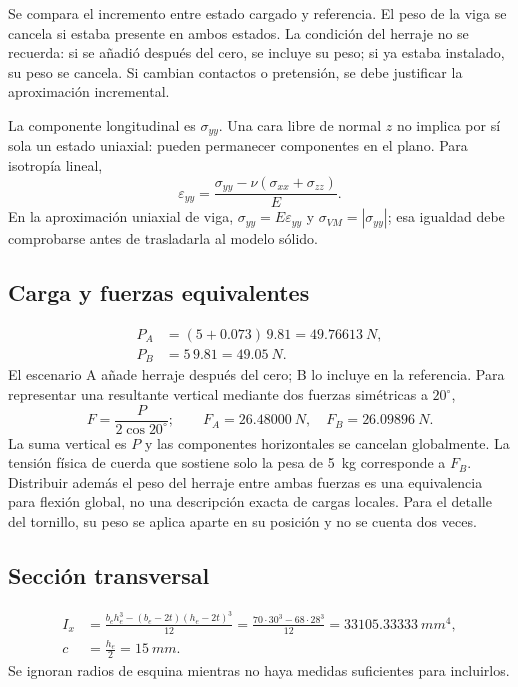 \documentclass[11pt,a4paper]{article}
\begin{document}
Se compara el incremento entre estado cargado y referencia. El peso de la viga se cancela si estaba presente en ambos estados. La condición del herraje no se recuerda: si se añadió después del cero, se incluye su peso; si ya estaba instalado, su peso se cancela. Si cambian contactos o pretensión, se debe justificar la aproximación incremental.

La componente longitudinal es $\sigma_{yy}$. Una cara libre de normal $z$ no implica por sí sola un estado uniaxial: pueden permanecer componentes en el plano. Para isotropía lineal,
\begin{equation}\varepsilon_{yy}=\frac{\sigma_{yy}-\nu(\sigma_{xx}+\sigma_{zz})}{E}.\end{equation}
En la aproximación uniaxial de viga, $\sigma_{yy}=E\varepsilon_{yy}$ y $\sigma_{VM}=|\sigma_{yy}|$; esa igualdad debe comprobarse antes de trasladarla al modelo sólido.

\subsection{Carga y fuerzas equivalentes}
\begin{align}
P_A&=(5+0.073)\,9.81=\SI{49.76613}{N},\\
P_B&=5\,9.81=\SI{49.05}{N}.
\end{align}
El escenario A añade herraje después del cero; B lo incluye en la referencia. Para representar una resultante vertical mediante dos fuerzas simétricas a $20^\circ$,
\begin{equation}F=\frac{P}{2\cos20^\circ};\qquad F_A=\SI{26.48000}{N},\quad F_B=\SI{26.09896}{N}.\end{equation}
La suma vertical es $P$ y las componentes horizontales se cancelan globalmente. La tensión física de cuerda que sostiene solo la pesa de \SI{5}{kg} corresponde a $F_B$. Distribuir además el peso del herraje entre ambas fuerzas es una equivalencia para flexión global, no una descripción exacta de cargas locales. Para el detalle del tornillo, su peso se aplica aparte en su posición y no se cuenta dos veces.

\subsection{Sección transversal}
\begin{align}
I_x&=\frac{b_e h_e^3-(b_e-2t)(h_e-2t)^3}{12}
=\frac{70\cdot30^3-68\cdot28^3}{12}=\SI{33105.33333}{mm^4},\\
c&=\frac{h_e}{2}=\SI{15}{mm}.
\end{align}
Se ignoran radios de esquina mientras no haya medidas suficientes para incluirlos.
\end{document}
